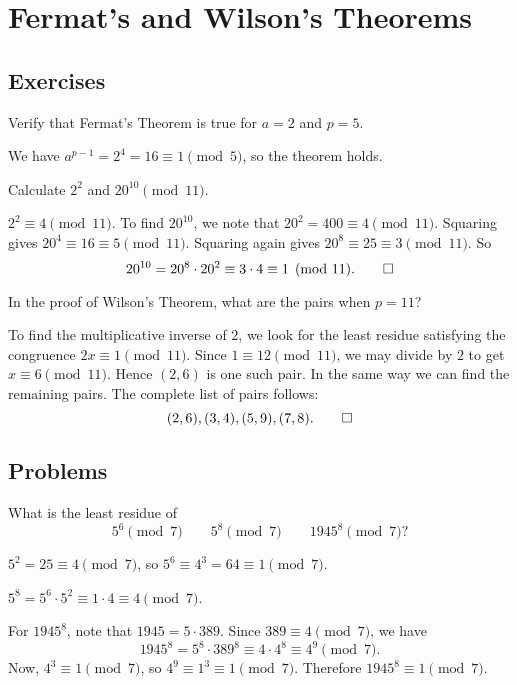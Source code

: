 \chapter{Fermat's and Wilson's Theorems}

\section{Exercises}

 Verify that Fermat's Theorem is true for $a = 2$ and $p = 5$.
\begin{solution}
  We have $a^{p-1} = 2^4 = 16 \equiv 1 \pmod 5$, so the theorem holds.
\end{solution}

 Calculate $2^2$ and $20^{10}\pmod{11}$.
\begin{solution}
  $2^2\equiv4\pmod{11}$. To find $20^{10}$, we note that
  $20^2 = 400 \equiv 4\pmod{11}$. Squaring gives
  $20^4\equiv16\equiv5\pmod{11}$. Squaring again gives
  $20^8\equiv25\equiv3\pmod{11}$. So
  \begin{equation*}
    20^{10} = 20^8\cdot20^2 \equiv 3\cdot4 \equiv 1 \pmod{11}.\qedhere
  \end{equation*}
\end{solution}

 In the proof of Wilson's Theorem, what are the pairs when
$p = 11$?
\begin{solution}
  To find the multiplicative inverse of $2$, we look for the least
  residue satisfying the congruence $2x\equiv1\pmod{11}$. Since
  $1\equiv12\pmod{11}$, we may divide by $2$ to get
  $x\equiv6\pmod{11}$. Hence $(2,6)$ is one such pair. In the same way
  we can find the remaining pairs. The complete list of pairs follows:
  \begin{equation*}
    (2,6), (3,4), (5,9), (7,8). \qedhere
  \end{equation*}
\end{solution}

\section{Problems}

 What is the least residue of
\begin{equation*}
  5^6\pmod7 \qquad 5^8\pmod7 \qquad 1945^8\pmod7?
\end{equation*}
\begin{solution}
  $5^2 = 25 \equiv 4 \pmod7$, so $5^6 \equiv 4^3 = 64 \equiv 1\pmod7$.

  $5^8 = 5^6\cdot5^2 \equiv 1\cdot4 \equiv 4\pmod7$.

  For $1945^8$, note that $1945 = 5\cdot389$. Since
  $389\equiv4\pmod7$, we have
  \begin{equation*}
    1945^8 = 5^8\cdot389^8 \equiv 4\cdot4^8 \equiv 4^9\pmod7.
  \end{equation*}
  Now, $4^3\equiv 1\pmod7$, so $4^9\equiv1^3\equiv1\pmod7$. Therefore
  $1945^8\equiv1\pmod7$.
\end{solution}
